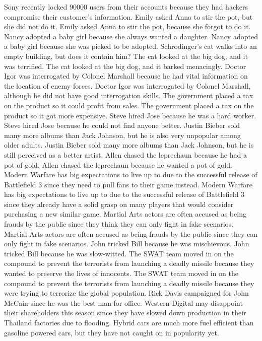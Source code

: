 \documentclass{article}
\begin{document}
\begin{enumerate}
Sony recently locked 90000 users from their accounts because they had hackers compromise their customer's information.
Emily asked Anna to stir the pot, but she did not do it.
Emily asked Anna to stir the pot, because she forgot to do it.
Nancy adopted a baby girl because she always wanted a daughter.
Nancy adopted a baby girl because she was picked to be adopted.
Schrodinger's cat walks into an empty building, but does it contain him?
The cat looked at the big dog, and it was terrified.
The cat looked at the big dog, and it barked menacingly.
Doctor Igor was interrogated by Colonel Marshall because he had vital information on the location of enemy forces.
Doctor Igor was interrogated by Colonel Marshall, although he did not have good interrogation skills.
The government placed a tax on the product so it could profit from sales.
The government placed a tax on the product so it got more expensive.
Steve hired Jose because he was a hard worker.
Steve hired Jose because he could not find anyone better.
Justin Bieber sold many more albums than Jack Johnson, but he is also very unpopular among older adults.
Justin Bieber sold many more albums than Jack Johnson, but he is still perceived as a better artist.
Allen chased the leprechaun because he had a pot of gold.
Allen chased the leprechaun because he wanted a pot of gold.
Modern Warfare has big expectations to live up to due to the successful release of Battlefield 3 since they need to pull fans to their game instead.
Modern Warfare has big expectations to live up to due to the successful release of Battlefield 3 since they already have a solid grasp on many players that would consider purchasing a new similar game.
Martial Arts actors are often accused as being frauds by the public since they think they can only fight in fake scenarios.
Martial Arts actors are often accused as being frauds by the public since they can only fight in fake scenarios.
John tricked Bill because he was mischievous.
John tricked Bill because he was slow-witted.
The SWAT team moved in on the compound to prevent the terrorists from launching a deadly missile because they wanted to preserve the lives of innocents.
The SWAT team moved in on the compound to prevent the terrorists from launching a deadly missile because they were trying to terrorize the global population.
Rick Davis campaigned for John McCain since he was the best man for office.
Western Digital may disappoint their shareholders this season since they have slowed down production in their Thailand factories due to flooding.
Hybrid cars are much more fuel efficient than gasoline powered cars, but they have not caught on in popularity yet.

\end{enumerate}
\end{document}
